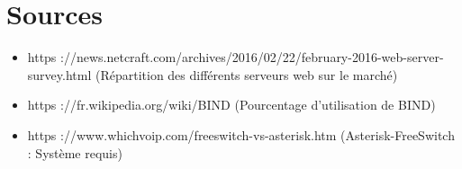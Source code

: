 \documentclass[a4paper,12pt]{article}
\begin{document}
\section{Sources}
	\begin{itemize}
		\item https ://news.netcraft.com/archives/2016/02/22/february-2016-web-server-survey.html
(Répartition des différents serveurs web sur le marché)
		\item https ://fr.wikipedia.org/wiki/BIND (Pourcentage d’utilisation de BIND)
		\item https ://www.whichvoip.com/freeswitch-vs-asterisk.htm (Asterisk-FreeSwitch : Système
requis)
	\end{itemize}
\end{document}
